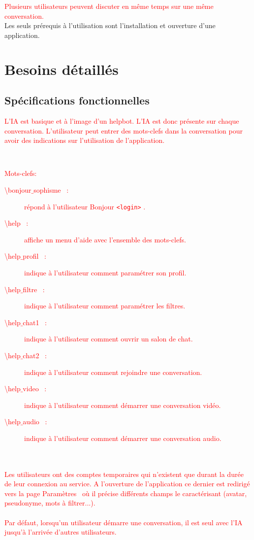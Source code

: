 \documentclass[11pt,dvipsnames,svgnames]{report}
\begin{document}
\textcolor{red}{Plusieurs utilisateurs peuvent discuter en même temps sur une même conversation.}\\

Les seuls prérequis à l'utilisation sont l'installation et ouverture d'une application.

\chapter{Besoins détaillés}

\section{Spécifications fonctionnelles}

\textcolor{red}{L'IA est basique et à l'image d'un helpbot. L'IA est donc présente sur chaque conversation. L'utilisateur peut entrer des mots-clefs dans la conversation pour avoir des indications sur l'utilisation de l'application. }

~\\
\textcolor{red}{ Mots-clefs:
\begin{description}
\item[\og \textbackslash bonjour$\_$sophisme \fg\ :] répond à l'utilisateur \og Bonjour \texttt{<login>} \fg.
\item[\og \textbackslash help \fg\ :] affiche un menu d'aide avec l'ensemble des mots-clefs.
\item[\og \textbackslash help$\_$profil \fg\ :] indique à l'utilisateur comment paramétrer son profil.
\item[\og \textbackslash help$\_$filtre \fg\ :] indique à l'utilisateur comment paramétrer les filtres.
\item[\og \textbackslash help$\_$chat1 \fg\ :] indique à l'utilisateur comment ouvrir un salon de chat.
\item[\og \textbackslash help$\_$chat2 \fg\ :] indique à l'utilisateur comment rejoindre une conversation.
\item[\og \textbackslash help$\_$video \fg\ :] indique à l'utilisateur comment démarrer une conversation vidéo.
\item[\og \textbackslash help$\_$audio \fg\ :] indique à l'utilisateur comment démarrer une conversation audio.
\end{description}
}

~\\\\
\textcolor{red}{	Les utilisateurs ont des comptes temporaires qui n'existent que durant la durée de leur connexion au service. A l'ouverture de l'application ce dernier est redirigé vers la page \og Paramètres \fg\ où il précise différents champs le caractérisant (avatar, pseudonyme, mots à filtrer...).}
~\\\\
\textcolor{red}{Par défaut, lorsqu'un utilisateur démarre une conversation, il est seul avec l'IA jusqu'à l'arrivée d'autres utilisateurs.}
\end{document}
